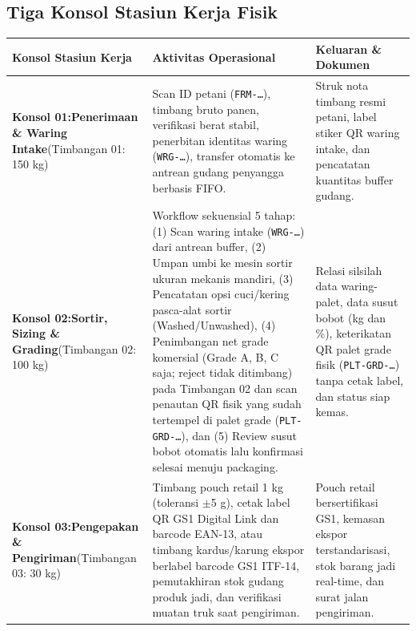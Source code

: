 \documentclass[12pt,a4paper]{article}
\begin{document}
\subsection{Tiga Konsol Stasiun Kerja Fisik}

\begin{longtable}{@{}>{\raggedright\arraybackslash}p{3.4cm}>{\raggedright\arraybackslash}p{6.4cm}>{\raggedright\arraybackslash}p{5.4cm}@{}}
\toprule
\textbf{Konsol Stasiun Kerja} & \textbf{Aktivitas Operasional} & \textbf{Keluaran \& Dokumen} \\
\midrule
\endhead
\textbf{Konsol 01:\newline Penerimaan \& Waring Intake}\newline(Timbangan 01: 150 kg) &
Scan ID petani (\texttt{FRM-\ldots}), timbang bruto panen, verifikasi berat stabil, penerbitan identitas waring (\texttt{WRG-\ldots}), transfer otomatis ke antrean gudang penyangga berbasis FIFO. &
Struk nota timbang resmi petani, label stiker QR waring intake, dan pencatatan kuantitas buffer gudang. \\
\hline
\textbf{Konsol 02:\newline Sortir, Sizing \& Grading}\newline(Timbangan 02: 100 kg) &
Workflow sekuensial 5 tahap: (1) Scan waring intake (\texttt{WRG-\ldots}) dari antrean buffer, (2) Umpan umbi ke mesin sortir ukuran mekanis mandiri, (3) Pencatatan opsi cuci/kering pasca-alat sortir (Washed/Unwashed), (4) Penimbangan net grade komersial (Grade A, B, C saja; reject tidak ditimbang) pada Timbangan 02 dan scan penautan QR fisik yang sudah tertempel di palet grade (\texttt{PLT-GRD-\ldots}), dan (5) Review susut bobot otomatis lalu konfirmasi selesai menuju packaging. &
Relasi silsilah data waring-palet, data susut bobot (kg dan \%), keterikatan QR palet grade fisik (\texttt{PLT-GRD-\ldots}) tanpa cetak label, dan status siap kemas. \\
\hline
\textbf{Konsol 03:\newline Pengepakan \& Pengiriman}\newline(Timbangan 03: 30 kg) &
Timbang pouch retail 1 kg (toleransi $\pm$5 g), cetak label QR GS1 Digital Link dan barcode EAN-13, atau timbang kardus/karung ekspor berlabel barcode GS1 ITF-14, pemutakhiran stok gudang produk jadi, dan verifikasi muatan truk saat pengiriman. &
Pouch retail bersertifikasi GS1, kemasan ekspor terstandarisasi, stok barang jadi real-time, dan surat jalan pengiriman. \\
\bottomrule
\end{longtable}
\end{document}
